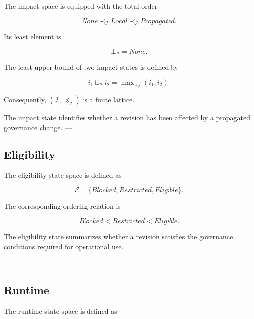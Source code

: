 \documentclass[10pt]{article}
\begin{document}
The impact space is equipped with the total order

\begin{equation}
	None
	\prec_{\mathcal I}
	Local
	\prec_{\mathcal I}
	Propagated.
	\label{eq:impact_order}
\end{equation}

Its least element is

\begin{equation}
	\bot_{\mathcal{I}}
	=
	None.
	\label{eq:impact_bottom}
\end{equation}

The least upper bound of two impact states is defined by

\begin{equation}
	i_1
	\sqcup_{\mathcal{I}}
	i_2
	=
	\max\nolimits_{\prec_{\mathcal{I}}}
	\left(i_1,i_2\right).
	\label{eq:impact_join}
\end{equation}

Consequently,
$\left(\mathcal{I},\preceq_{\mathcal{I}}\right)$ is a finite lattice.

The impact state identifies whether a revision has been affected by a propagated governance change.
---

\subsection{Eligibility}

The eligibility state space is defined as

\begin{equation}
	\mathcal{E}=
	\{
	Blocked,
	Restricted,
	Eligible
	\}.
	\label{eq:eligibility_space}
\end{equation}

The corresponding ordering relation is

\begin{equation}
	Blocked
	<
	Restricted
	<
	Eligible.
	\label{eq:eligibility_order}
\end{equation}

The eligibility state summarizes whether a revision satisfies the governance conditions required for operational use.

---

\subsection{Runtime}

The runtime state space is defined as
\end{document}
